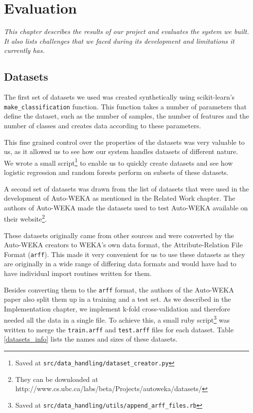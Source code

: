 \documentclass[a4paper,12pt,twoside,openright]{report}
\begin{document}
\chapter{Evaluation}

\textit{This chapter describes the results of our project and evaluates the system we built. It also lists challenges that we faced during its development and limitations it currently has.}




\section{Datasets}
The first set of datasets we used was created synthetically using scikit-learn's \texttt{make\_classification} function. This function takes a number of parameters that define the dataset, such as the number of samples, the number of features and the number of classes and creates data according to these parameters. 

This fine grained control over the properties of the datasets was very valuable to us, as it allowed us to see how our system handles datasets of different nature. We wrote a small script\footnote{Saved at \texttt{src/data\_handling/dataset\_creator.py}} to enable us to quickly create datasets and see how logistic regression and random forests perform on subsets of these datasets.


A second set of datasets was drawn from the list of datasets that were used in the development of Auto-WEKA as mentioned in the Related Work chapter. The authors of Auto-WEKA made the datasets used to test Auto-WEKA available on their website\footnote{They can be downloaded at http://www.cs.ubc.ca/labs/beta/Projects/autoweka/datasets/}.


These datasets originally came from other sources \cite{Lichman:2013, Larochelle:2007:EED:1273496.1273556, Krizhevsky09learningmultiple} and were converted by the Auto-WEKA creators to WEKA's own data format, the Attribute-Relation File Format (\texttt{arff}). This made it very convenient for us to use these datasets as they are originally in a wide range of differing data formats and would have had to have individual import routines written for them. 

Besides converting them to the \texttt{arff} format, the authors of the Auto-WEKA paper also split them up in a training and a test set. As we described in the Implementation chapter, we implement k-fold cross-validation and therefore needed all the data in a single file. To achieve this, a small ruby script\footnote{Saved at \texttt{src/data\_handling/utils/append\_arff\_files.rb}} was written to merge the \texttt{train.arff} and \texttt{test.arff} files for each dataset. Table \ref{datasets_info} lists the names and sizes of these datasets.
\end{document}
